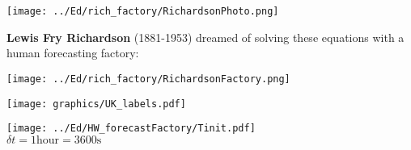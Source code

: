 \begin{slide}{}

\begin{minipage}{0.38\linewidth}
\texttt{[image: ../Ed/rich\_factory/RichardsonPhoto.png]}
\end{minipage}
\hfill
\begin{minipage}{0.58\linewidth}
{\large\bf Lewis Fry Richardson} (1881-1953)
dreamed of solving these equations with a human forecasting factory:

\texttt{[image: ../Ed/rich\_factory/RichardsonFactory.png]}

\end{minipage}

\end{slide}

\begin{slide}{}

\begin{minipage}[t]{0.65\linewidth}
    \texttt{[image: graphics/UK\_labels.pdf]}
\end{minipage}
\begin{minipage}[t]{0.35\linewidth}
    \texttt{[image: ../Ed/HW\_forecastFactory/Tinit.pdf]}\\
    $\delta t = 1\text{hour} = 3600\text{s}$
\end{minipage}
\end{slide}

